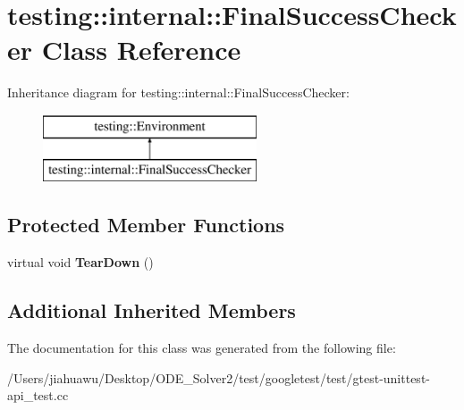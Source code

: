 \hypertarget{classtesting_1_1internal_1_1_final_success_checker}{}\section{testing\+:\+:internal\+:\+:Final\+Success\+Checker Class Reference}
\label{classtesting_1_1internal_1_1_final_success_checker}
Inheritance diagram for testing\+:\+:internal\+:\+:Final\+Success\+Checker\+:\begin{figure}[H]
\begin{center}
\leavevmode
\includegraphics[height=2.000000cm]{classtesting_1_1internal_1_1_final_success_checker}
\end{center}
\end{figure}
\subsection*{Protected Member Functions}
\begin{DoxyCompactItemize}
\item 
\mbox{\label{classtesting_1_1internal_1_1_final_success_checker_a8f39d12a1f2bfe8c6c04b5c6749382c9}} 
virtual void {\bfseries Tear\+Down} ()
\end{DoxyCompactItemize}
\subsection*{Additional Inherited Members}


The documentation for this class was generated from the following file\+:\begin{DoxyCompactItemize}
\item 
/\+Users/jiahuawu/\+Desktop/\+O\+D\+E\+\_\+\+Solver2/test/googletest/test/gtest-\/unittest-\/api\+\_\+test.\+cc\end{DoxyCompactItemize}
